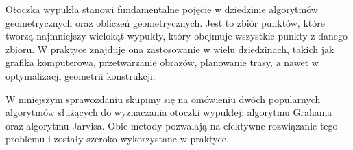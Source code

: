 \quad Otoczka wypukła stanowi fundamentalne pojęcie w dziedzinie algorytmów geometrycznych oraz obliczeń geometrycznych. Jest to zbiór punktów, które tworzą najmniejszy wielokąt wypukły, który obejmuje wszystkie punkty z danego zbioru. W praktyce znajduje ona zastosowanie w wielu dziedzinach, takich jak grafika komputerowa, przetwarzanie obrazów, planowanie trasy, a nawet w optymalizacji geometrii konstrukcji.

W niniejszym sprawozdaniu skupimy się na omówieniu dwóch popularnych algorytmów służących do wyznaczania otoczki wypukłej: algorytmu Grahama oraz algorytmu Jarvisa. Obie metody pozwalają na efektywne rozwiązanie tego problemu i zostały szeroko wykorzystane w praktyce.

